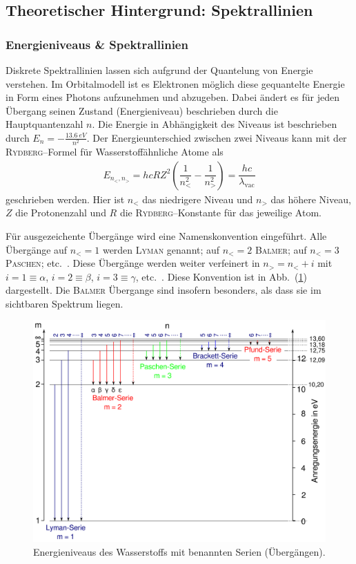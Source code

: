 \documentclass[sn-mathphys-num,iicol]{sn-jnl}
\theoremstyle{thmstyleone}
\theoremstyle{thmstyletwo}
\theoremstyle{thmstylethree}
\begin{document}
\subsection{Theoretischer Hintergrund: Spektrallinien}
\subsubsection{Energieniveaus \& Spektrallinien}
Diskrete Spektrallinien lassen sich aufgrund der Quantelung von Energie verstehen.
Im Orbitalmodell ist es Elektronen möglich diese gequantelte Energie in Form eines Photons aufzunehmen und abzugeben.
Dabei ändert es für jeden Übergang seinen Zustand (Energieniveau) beschrieben durch die Hauptquantenzahl $n$.
Die Energie in Abhängigkeit des Niveaus ist beschrieben durch $E_n=-\tfrac{\SI{13.6}{eV}}{n^2}$.
Der Energieunterschied zwischen zwei Niveaus kann mit der \textsc{Rydberg}--Formel für Wasserstoffähnliche Atome als 
\begin{align} 
        E_{n_<,n_>}=hcRZ^2\left(\dfrac{1}{n_<^2}-\dfrac{1}{n_>^2}\right)=\dfrac{hc}{\lambda _\text{vac}}
\end{align} 
geschrieben werden.
Hier ist $n_<$ das niedrigere Niveau und $n_>$ das höhere Niveau, $Z$ die Protonenzahl und $R$ die \textsc{Rydberg}--Konstante für das jeweilige Atom.

Für ausgezeichente Übergänge wird eine Namenskonvention eingeführt.
Alle Übergänge auf $n_<=1$ werden \textsc{Lyman} genannt; auf $n_<=2$ \textsc{Balmer}; auf $n_<=3$ \textsc{Paschen}; etc.\ .
Diese Übergänge werden weiter verfeinert in $n_>=n_<+i$ mit $i=1\equiv \alpha $, $i=2\equiv \beta $, $i=3\equiv \gamma $, etc.\ .
Diese Konvention ist in Abb.\ (\ref{fig:serien}) dargestellt.
Die \textsc{Balmer} Übergange sind insofern besonders, als dass sie im sichtbaren Spektrum liegen.

\begin{figure}[t]
        \centering
        \includegraphics[width=.5\textwidth]{402_serien.png}
        \caption{Energieniveaus des Wasserstoffs mit benannten Serien (Übergängen).\cite{WikipediaSerien}} \label{fig:serien}
\end{figure}
\end{document}
